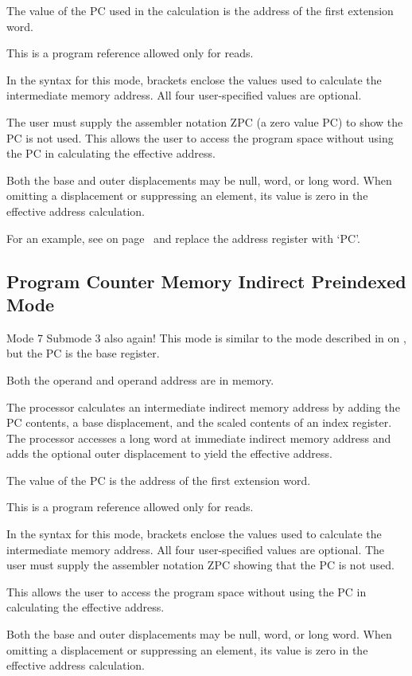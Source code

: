 The value of the PC used in the calculation is the address of the first
extension word. 

This is a program reference allowed only for reads.

In the syntax for this mode, brackets enclose the values used to calculate the intermediate memory address. All four user-specified values are optional. 

The user must supply the assembler notation ZPC (a zero value PC) to show the PC is not used. This allows the user to access the program space without using the PC in calculating the effective address. 

Both the base and outer displacements may be null, word, or long word. When omitting a
displacement or suppressing an element, its value is zero in the effective address
calculation.

For an example, see \emph{} on page~\pageref{sub-MIPostI} and replace the address register with `PC'.

\subsection{Program Counter Memory Indirect Preindexed Mode}
Mode 7 Submode 3 also again! This mode is similar to the mode described in \emph{} on \pageref{sub-MIPreI}, but the PC is the base register. 

Both the operand and operand address are in memory. 

The processor calculates an intermediate indirect memory address by adding the PC contents, a base displacement, and the scaled contents of an index register. The processor accesses a long word at immediate indirect memory address and adds the optional outer displacement to yield the effective address. 

The value of the PC is the address of the first extension word. 

This is a program reference allowed only for reads.

In the syntax for this mode, brackets enclose the values used to calculate the intermediate memory address. All four user-specified values are optional. The user must supply the assembler notation ZPC showing that the PC is not used. 

This allows the user to access the program space without using the PC in calculating the effective address. 

Both the base and outer displacements may be null, word, or long word. When omitting a displacement or suppressing an element, its value is zero in the effective address calculation.

